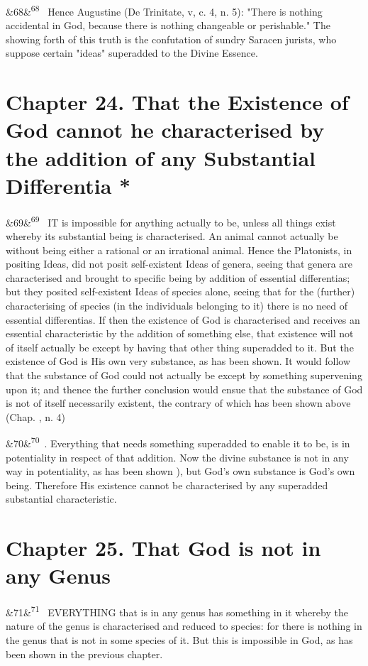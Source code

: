 \documentclass[12pt]{article}
\newcommand{\para}[1][]{\par\noindent\ifx&#1&\else\textsuperscript{\footnotesize #1}~\fi}
\begin{document}
\para[68] Hence Augustine (De Trinitate, v, c. 4, n. 5): "There is nothing accidental in God, because there is nothing changeable or perishable." The showing forth of this truth is the confutation of sundry Saracen jurists, who suppose certain "ideas" superadded to the Divine Essence.

\section*{Chapter 24. That the Existence of God cannot he characterised by the addition of any Substantial Differentia *}

\para[69] IT is impossible for anything actually to be, unless all things exist whereby its substantial being is characterised. An animal cannot actually be without being either a rational or an irrational animal. Hence the Platonists, in positing Ideas, did not posit self-existent Ideas of genera, seeing that genera are characterised and brought to specific being by addition of essential differentias; but they posited self-existent Ideas of species alone, seeing that for the (further) characterising of species (in the individuals belonging to it) there is no need of essential differentias. If then the existence of God is characterised and receives an essential characteristic by the addition of something else, that existence will not of itself actually be except by having that other thing superadded to it. But the existence of God is His own very substance, as has been shown. It would follow that the substance of God could not actually be except by something supervening upon it; and thence the further conclusion would ensue that the substance of God is not of itself necessarily existent, the contrary of which has been shown above (Chap. , n. 4)

\para[70] 2. Everything that needs something superadded to enable it to be, is in potentiality in respect of that addition. Now the divine substance is not in any way in potentiality, as has been shown ), but God's own substance is God's own being. Therefore His existence cannot be characterised by any superadded substantial characteristic.

\section*{Chapter 25. That God is not in any Genus}

\para[71] EVERYTHING that is in any genus has something in it whereby the nature of the genus is characterised and reduced to species: for there is nothing in the genus that is not in some species of it. But this is impossible in God, as has been shown in the previous chapter.
\end{document}

